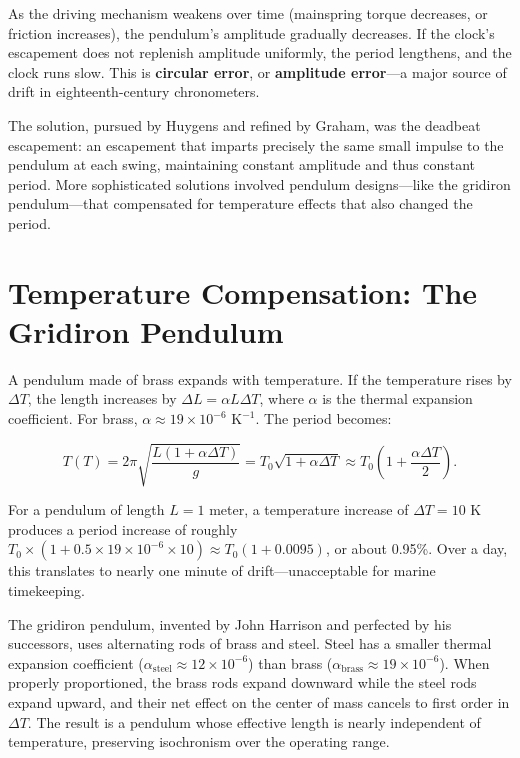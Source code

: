 As the driving mechanism weakens over time (mainspring torque decreases, or friction increases), the pendulum's amplitude gradually decreases. If the clock's escapement does not replenish amplitude uniformly, the period lengthens, and the clock runs slow. This is \textbf{circular error}, or \textbf{amplitude error}—a major source of drift in eighteenth-century chronometers.

The solution, pursued by Huygens and refined by Graham, was the deadbeat escapement: an escapement that imparts precisely the same small impulse to the pendulum at each swing, maintaining constant amplitude and thus constant period. More sophisticated solutions involved pendulum designs—like the gridiron pendulum—that compensated for temperature effects that also changed the period.

\section{Temperature Compensation: The Gridiron Pendulum}

A pendulum made of brass expands with temperature. If the temperature rises by $\Delta T$, the length increases by $\Delta L = \alpha L \Delta T$, where $\alpha$ is the thermal expansion coefficient. For brass, $\alpha \approx 19 \times 10^{-6} \text{ K}^{-1}$. The period becomes:

\[
  T(T) = 2\pi\sqrt{\frac{L(1 + \alpha\Delta T)}{g}} = T_0\sqrt{1 + \alpha\Delta T} \approx T_0\left(1 + \frac{\alpha\Delta T}{2}\right).
\]

For a pendulum of length $L = 1$ meter, a temperature increase of $\Delta T = 10 \text{ K}$ produces a period increase of roughly $T_0 \times (1 + 0.5 \times 19 \times 10^{-6} \times 10) \approx T_0(1 + 0.0095)$, or about 0.95\%. Over a day, this translates to nearly one minute of drift—unacceptable for marine timekeeping.

The gridiron pendulum, invented by John Harrison and perfected by his successors, uses alternating rods of brass and steel. Steel has a smaller thermal expansion coefficient ($\alpha_{\text{steel}} \approx 12 \times 10^{-6}$) than brass ($\alpha_{\text{brass}} \approx 19 \times 10^{-6}$). When properly proportioned, the brass rods expand downward while the steel rods expand upward, and their net effect on the center of mass cancels to first order in $\Delta T$. The result is a pendulum whose effective length is nearly independent of temperature, preserving isochronism over the operating range.

